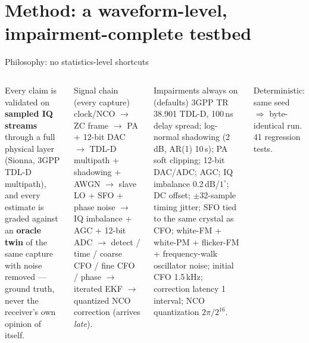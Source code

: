 \documentclass[aspectratio=169,10pt]{beamer}
\begin{document}
\section{Method: a waveform-level, impairment-complete testbed}

\begin{frame}{Philosophy: no statistics-level shortcuts}
  \begin{columns}[T]
    \small Every claim is validated on \textbf{sampled IQ streams}
    through a full physical layer (Sionna, 3GPP TDL-D multipath), and
    every estimate is graded against an \textbf{oracle twin} of the
    same capture with noise removed --- ground truth, never the
    receiver's own opinion of itself.
    \begin{block}{\small Signal chain (every capture)}
      \scriptsize clock/NCO $\to$ ZC frame $\to$ PA + 12-bit DAC $\to$
      TDL-D multipath + shadowing + AWGN $\to$ slave LO + SFO + phase
      noise $\to$ IQ imbalance + AGC + 12-bit ADC $\to$ detect /
      time / coarse CFO / fine CFO / phase $\to$ iterated EKF $\to$
      quantized NCO correction (arrives \emph{late}).
    \end{block}
    \begin{block}{\small Impairments always on (defaults)}
      \scriptsize 3GPP TR 38.901 TDL-D, 100\,ns delay spread;
      log-normal shadowing (2\,dB, AR(1) 10\,s); PA soft clipping;
      12-bit DAC/ADC; AGC; IQ imbalance 0.2\,dB/$1^\circ$; DC offset;
      $\pm$32-sample timing jitter; SFO tied to the same crystal as
      CFO; white-FM + white-PM + flicker-FM + frequency-walk
      oscillator noise; initial CFO 1.5\,kHz; correction latency 1
      interval; NCO quantization $2\pi/2^{16}$.
    \end{block}
    \small Deterministic: same seed $\Rightarrow$ byte-identical run.
    41 regression tests.
  \end{columns}
\end{frame}
\end{document}
